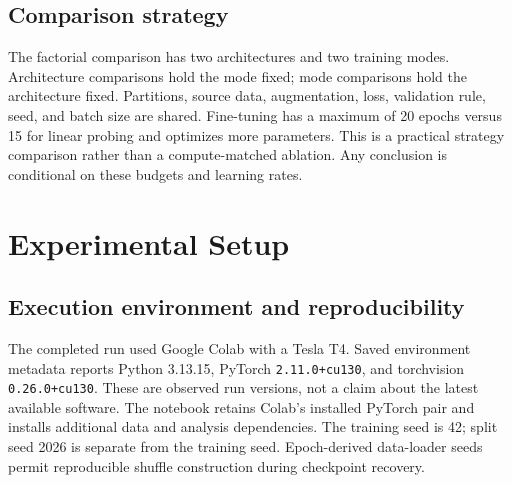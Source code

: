 \documentclass[10pt,a4paper]{article}
\begin{document}
\subsection{Comparison strategy}
The factorial comparison has two architectures and two training modes. Architecture comparisons hold the mode fixed; mode comparisons hold the architecture fixed. Partitions, source data, augmentation, loss, validation rule, seed, and batch size are shared. Fine-tuning has a maximum of 20 epochs versus 15 for linear probing and optimizes more parameters. This is a practical strategy comparison rather than a compute-matched ablation. Any conclusion is conditional on these budgets and learning rates.


\section{Experimental Setup}
\subsection{Execution environment and reproducibility}
The completed run used Google Colab with a Tesla T4. Saved environment metadata reports Python 3.13.15, PyTorch \texttt{2.11.0+cu130}, and torchvision \texttt{0.26.0+cu130}. These are observed run versions, not a claim about the latest available software. The notebook retains Colab's installed PyTorch pair and installs additional data and analysis dependencies. The training seed is 42; split seed 2026 is separate from the training seed. Epoch-derived data-loader seeds permit reproducible shuffle construction during checkpoint recovery.
\end{document}
